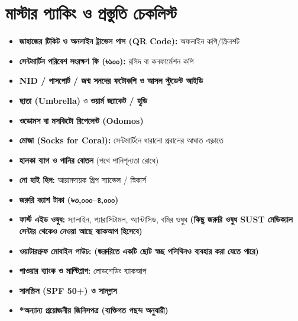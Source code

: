\documentclass[11pt]{article}
\begin{document}
\newpage

\section*{মাস্টার প্যাকিং ও প্রস্তুতি চেকলিস্ট}
\small
\begin{itemize}
    \item[$\square$] \textbf{জাহাজের টিকিট ও অনলাইন ট্রাভেল পাস (QR Code):} অফলাইন কপি/স্ক্রিনশট
    \item[$\square$] \textbf{সেন্টমার্টিন পরিবেশ সংরক্ষণ ফি (৳১০০):} রসিদ বা কনফার্মেশন কপি
    \item[$\square$] \textbf{NID / পাসপোর্ট / জন্ম সনদের ফটোকপি ও আসল স্টুডেন্ট আইডি}
    \item[$\square$] \textbf{ছাতা (Umbrella)} ও \textbf{ওয়ার্ম জ্যাকেট / হুডি}
    \item[$\square$] \textbf{ওডোমস বা মসকিটো রিপেলেন্ট (Odomos)}
    \item[$\square$] \textbf{মোজা (Socks for Coral):} সেন্টমার্টিনে ধারালো প্রবালের আঘাত এড়াতে
    \item[$\square$] \textbf{হালকা ব্যাগ ও পানির বোতল} (পথে পানিশূন্যতা রোধে)
    \item[$\square$] \textbf{নো হাই হিল:} আরামদায়ক গ্রিপ স্যান্ডেল / স্নিকার্স
    \item[$\square$] \textbf{জরুরি ক্যাশ টাকা (৳৩,০০০--৪,০০০)}
    \item[$\square$] \textbf{ফার্স্ট এইড ওষুধ:} স্যালাইন, প্যারাসিটামল, অ্যান্টাসিড, বমির ওষুধ \textbf{(কিছু জরুরি ওষুধ SUST মেডিক্যাল সেন্টার থেকেও নেওয়া আছে ব্যাকআপ হিসেবে)}
    \item[$\square$] \textbf{ওয়াটারপ্রুফ মোবাইল পাউচ:} \textbf{(জরুরিতে একটি ছোট স্বচ্ছ পলিথিনও ব্যবহার করা যেতে পারে)}
    \item[$\square$] \textbf{পাওয়ার ব্যাংক ও মাল্টিপ্লাগ:} লোডশেডিং ব্যাকআপ
    \item[$\square$] \textbf{সানস্ক্রিন (SPF 50+) ও সানগ্লাস}
    \item[$\square$] \textbf{*অন্যান্য প্রয়োজনীয় জিনিসপত্র (ব্যক্তিগত পছন্দ অনুযায়ী)}
\end{itemize}

\vspace{1.5mm}
\end{document}
